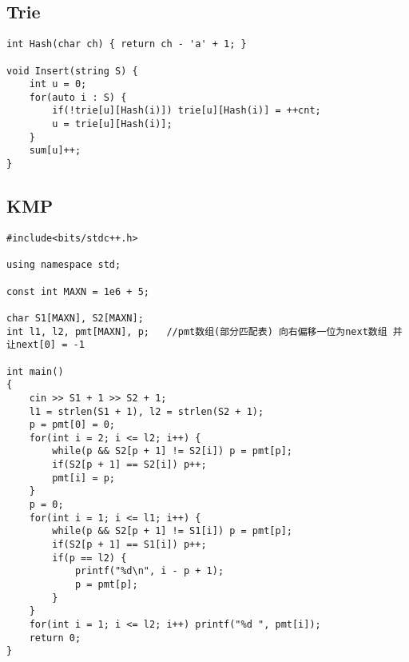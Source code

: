 \subsection{Trie}
\begin{lstlisting}
int Hash(char ch) { return ch - 'a' + 1; }

void Insert(string S) {
	int u = 0;
	for(auto i : S) {
		if(!trie[u][Hash(i)]) trie[u][Hash(i)] = ++cnt;
		u = trie[u][Hash(i)];
	}
	sum[u]++;
}
\end{lstlisting}

\subsection{KMP}
\begin{lstlisting}
#include<bits/stdc++.h>

using namespace std;

const int MAXN = 1e6 + 5;

char S1[MAXN], S2[MAXN];
int l1, l2, pmt[MAXN], p;	//pmt数组(部分匹配表) 向右偏移一位为next数组 并让next[0] = -1

int main()
{
	cin >> S1 + 1 >> S2 + 1;
	l1 = strlen(S1 + 1), l2 = strlen(S2 + 1);
	p = pmt[0] = 0;
	for(int i = 2; i <= l2; i++) {
		while(p && S2[p + 1] != S2[i]) p = pmt[p];
		if(S2[p + 1] == S2[i]) p++;
		pmt[i] = p;
	}
	p = 0;
	for(int i = 1; i <= l1; i++) {
		while(p && S2[p + 1] != S1[i]) p = pmt[p];
		if(S2[p + 1] == S1[i]) p++;
		if(p == l2) {
			printf("%d\n", i - p + 1);
			p = pmt[p];
		}
	}
	for(int i = 1; i <= l2; i++) printf("%d ", pmt[i]);
	return 0;
}
\end{lstlisting}

